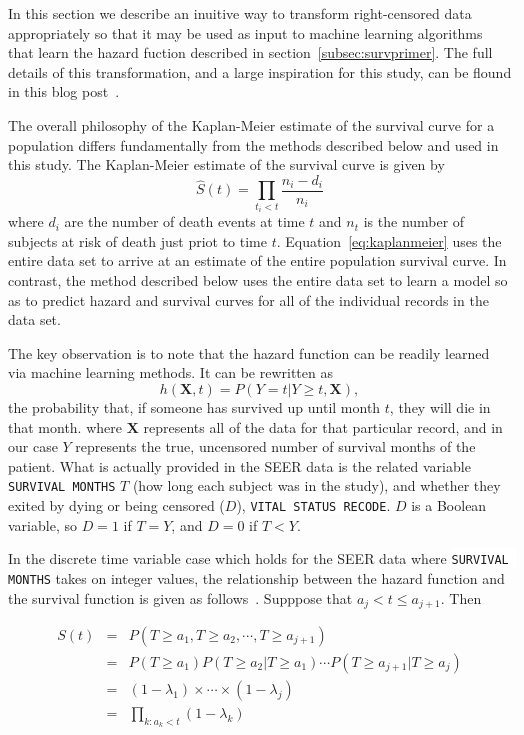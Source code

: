 \documentclass[a4paper,11pt]{article}
\newcommand{\codewhite}[1]{\colorbox{white}{\texttt{#1}}}
\begin{document}
In this section we describe an inuitive way to transform right-censored data appropriately so that it may be used as input to machine learning algorithms that learn the hazard fuction described in section~\ref{subsec:survprimer}. The full details of this transformation, and a large inspiration for this study, can be flound in this blog post~\cite{kuhn}.

The overall philosophy of the Kaplan-Meier estimate of the survival curve for a population differs fundamentally from the methods described below and used in this study. 
The Kaplan-Meier estimate of the survival curve is given by
\begin{equation}
\label{eq:kaplanmeier}
\hat{S}(t) = \prod_{t_i < t} \frac{n_i - d_i}{n_i}
\end{equation}
where $d_i$ are the number of death events at time $t$ and $n_t$ is the number of subjects at risk of death just priot to time $t$. 
Equation~\ref{eq:kaplanmeier} uses the entire data set to arrive at an estimate of the entire population survival curve. In contrast, the method described below uses the entire data set to learn a model so as to predict hazard and survival curves for all of the individual records in the data set.

The key observation is to note that the hazard function can be readily learned via machine learning methods. It can be rewritten as
\begin{equation}
\label{eq:hhazard}
h(\mathbf{X}, t) = P(Y = t|Y \geq t, \mathbf{X}),
\end{equation}
the probability that, if someone has survived up until month $t$, they will die in that month.
where $\mathbf{X}$ represents all of the data for that particular record, and in our case $Y$ represents the true, uncensored number of survival months of the patient.
What is actually provided in the SEER data is the related variable \codewhite{SURVIVAL MONTHS} $T$ (how long each subject was in the study), and whether they exited by dying or being censored ($D$), \codewhite{VITAL STATUS RECODE}. 
$D$ is a Boolean variable, so $D = 1$ if $T = Y$, and $D = 0$ if $T < Y$.


In the discrete time variable case which holds for the SEER data where \codewhite{SURVIVAL MONTHS} takes on integer values, the relationship between the hazard function and the survival function is given as follows~\cite{amstat}. Supppose that 
$a_{j} < t \leq a_{j+1}$. Then

\begin{eqnarray}
S(t) &  = & P(T \geq a_{1}, T \geq a_{2}, \cdots , T \geq a_{j+1}) \\
   & = & P(T \geq a_{1}) P(T \geq a_{2} | T \geq a_{1}) \cdots P(T \geq a_{j+1} | T \geq a_{j}) \\
 & = & (1 - \lambda_{1}) \times \cdots \times (1 - \lambda_{j}) \\
 & = & \prod_{k: a_{k} < t}(1 - \lambda_{k})
\end{eqnarray}
\end{document}
